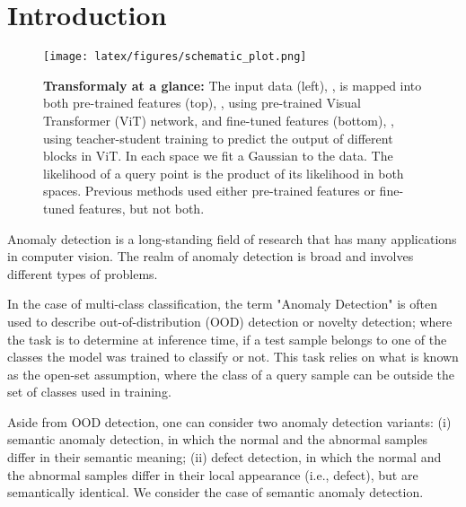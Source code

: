 \documentclass[10pt,twocolumn,letterpaper]{article}
\begin{document}
    


    







    

















%
 
\section{Introduction}


\begin{figure}[t]
\begin{center}
\texttt{[image: latex/figures/schematic\_plot.png]}
\end{center}
  \caption{{\bf Transformaly at a glance:} The input data (left), , is mapped into both pre-trained features (top), , using pre-trained Visual Transformer (ViT) network, and fine-tuned features (bottom), , using teacher-student training to predict the output of different blocks in ViT. In each space we fit a Gaussian to the data. The likelihood of a query point is the product of its likelihood in both spaces. 
  Previous methods used either pre-trained features or fine-tuned features, but not both.
}
\label{fig:SchematicPlot}
\end{figure}


Anomaly detection is a long-standing field of research that has many applications in computer vision. The realm of anomaly detection is broad and involves different types of problems.


In the case of multi-class classification, the term "Anomaly Detection" is often used to describe out-of-distribution (OOD) detection or novelty detection; where the task is to determine at inference time, if a test sample belongs to one of the classes the model was trained to classify or not. This task relies on what is known as the open-set assumption, where the class of a query sample can be outside the set of classes used in training.

Aside from OOD detection, one can consider two anomaly detection variants: (i) semantic anomaly detection, in which the normal and the abnormal samples differ in their semantic meaning; (ii) defect detection, in which the normal and the abnormal samples differ in their local appearance (i.e., defect), but are semantically identical. We consider the case of semantic anomaly detection.
\end{document}
